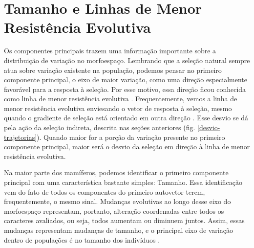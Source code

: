 \documentclass[portuges,]{tufte-handout}
\begin{document}
\section{Tamanho e Linhas de Menor Resistência
Evolutiva}\label{tamanho-e-linhas-de-menor-resistuxeancia-evolutiva}

Os componentes principais trazem uma informação importante sobre a
distribuição de variação no morfoespaço. Lembrando que a seleção natural
sempre atua sobre variação existente na população, podemos pensar no
primeiro componente principal, o eixo de maior variação, como uma
direção especialmente favorável para a resposta à seleção. Por esse
motivo, essa direção ficou conhecida como linha de menor resistência
evolutiva \cite{Schluter1996}. Frequentemente, vemos a linha de
menor resistência evolutiva enviesando o vetor de resposta à seleção,
mesmo quando o gradiente de seleção está orientado em outra direção
\cite{Schluter1996,Marroig2005}. Esse desvio se dá pela ação da
seleção indireta, descrita nas seções anteriores (fig.
\ref{desvio-trajetorias}). Quando maior for a porção da variação
presente no primeiro componente principal, maior será o desvio da
seleção em direção à linha de menor resistência evolutiva.

Na maior parte dos mamíferos, podemos identificar o primeiro componente
principal com uma característica bastante simples: Tamanho. Essa
identificação vem do fato de todos os componentes do primeiro autovetor
terem, frequentemente, o mesmo sinal. Mudanças evolutivas ao longo desse
eixo do morfoespaço representam, portanto, alteração coordenadas entre
todos os caracteres avaliados, ou seja, todos aumentam ou diminuem
juntos. Assim, essas mudanças representam mudanças de tamanho, e o
principal eixo de variação dentro de populações é no tamanho dos
indivíduos \cite{Marroig2005,Porto2009,Marroig2010}.



\end{document}

